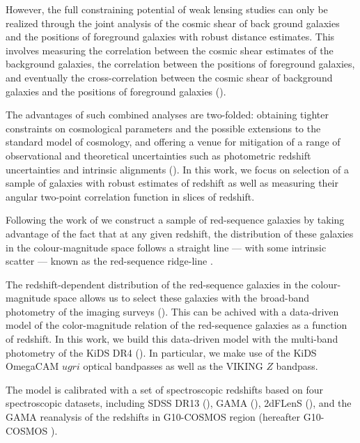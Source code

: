 \documentclass[fleqn,usenatbib,useAMS]{mnras}
\begin{document}
However, the full constraining potential of weak lensing studies can only be realized through the joint analysis of the cosmic shear of back ground galaxies and the positions of foreground galaxies with robust distance estimates. This involves measuring the correlation between the cosmic shear estimates of the background galaxies, the correlation between the positions of foreground galaxies, and eventually the cross-correlation between the cosmic shear of background galaxies and the positions of foreground galaxies (\citealt{cacciato2013, cosmolike, des_y1_cosmology, elvin2017, edo2018, prat2017}). 

The advantages of such combined analyses are two-folded: obtaining tighter constraints on cosmological parameters and the possible extensions to the standard model of cosmology, and offering a venue for mitigation of a range of observational and theoretical uncertainties such as photometric redshift uncertainties and intrinsic alignments (\citealt{edo2016, joudaki2018, sam2019}). In this work, we focus on selection of a sample of galaxies with robust estimates of redshift as well as measuring their angular two-point correlation function in slices of redshift. 

Following the work of \citet{vakili2019} we construct a sample of red-sequence galaxies by taking advantage of the fact that at any given redshift, the distribution of these galaxies in the colour-magnitude space follows a straight line --- with some intrinsic scatter --- known as the red-sequence ridge-line \citep[e.g.][]{bower1992,ellis1997,gladders1998,stanford1998}. 

The redshift-dependent distribution of the red-sequence galaxies in the colour-magnitude space allows us to select these galaxies with the broad-band photometry of the imaging surveys (\citealt{gladders_yee2000,hao2009,redmap_sdss,rozo2016,elvin2017,oguri2018,vakili2019}). This can be achived with a data-driven model of the color-magnitude relation of the red-sequence galaxies as a function of redshift. In this work, we build this data-driven model with the multi-band photometry of the KiDS DR4 (\citealt{kuijken2019}). In particular, we make use of the KiDS OmegaCAM $ugri$ optical bandpasses as well as the VIKING $Z$ bandpass.  

The model is calibrated with a set of spectroscopic redshifts based on four spectroscopic datasets, including SDSS DR13 (\citealt{sdss_dr13}), GAMA (\citealt{driver2011}), 2dFLenS (\citealt{blake2016}), and the GAMA reanalysis of the redshifts in G10-COSMOS region (hereafter G10-COSMOS \citealt{davis2015}). 
\end{document}
